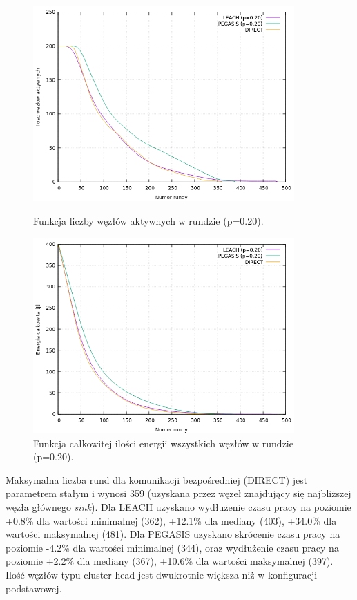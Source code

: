 \documentclass[a4paper,12pt,twoside,openany]{report}
\begin{document}
\begin{figure}[H]
 \centering
 \includegraphics[width=10cm]{images/gnuplot/test_4/nodes_in_round_p020.png}
 \caption{Funkcja liczby węzłów aktywnych w rundzie (p=0.20).}
 \includegraphics[width=10cm]{images/gnuplot/test_4/energy_in_round_p020.png}
 \caption{Funkcja całkowitej ilości energii wszystkich węzłów w rundzie (p=0.20).}
\end{figure}

\par
Maksymalna liczba rund dla komunikacji bezpośredniej (DIRECT) jest parametrem stałym i wynosi 359 (uzyskana przez węzeł znajdujący się najbliższej węzła głównego \textit{sink}).
Dla LEACH uzyskano wydłużenie czasu pracy na poziomie +0.8\% dla wartości minimalnej (362), +12.1\% dla mediany (403), +34.0\% dla wartości maksymalnej (481).
Dla PEGASIS uzyskano skrócenie czasu pracy na poziomie -4.2\% dla wartości minimalnej (344), oraz wydłużenie czasu pracy na poziomie +2.2\% dla mediany (367), +10.6\% dla wartości maksymalnej (397).
Ilość węzłów typu cluster head jest dwukrotnie większa niż w konfiguracji podstawowej.
\end{document}
